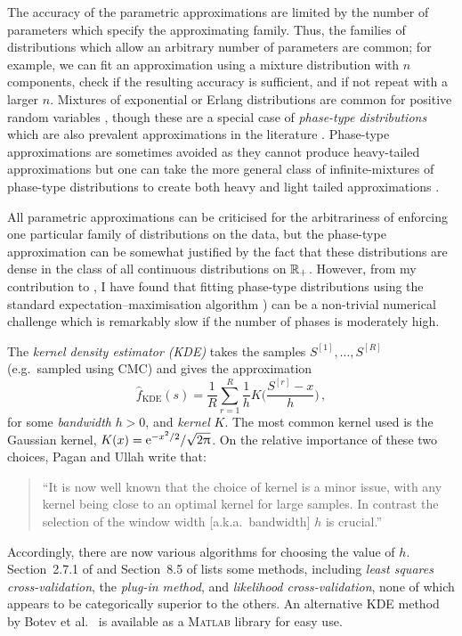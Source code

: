 The accuracy of the parametric approximations are limited by the number of parameters which specify the approximating family. Thus, the families of distributions which allow an arbitrary number of parameters are common; for example, we can fit an approximation using a mixture distribution with $n$ components, check if the resulting accuracy is sufficient, and if not repeat with a larger $n$. Mixtures of exponential or Erlang distributions are common for positive random variables \cite{WiWo07,LeLi10,WiLi11}, though these are a special case of \emph{phase-type distributions} which are also prevalent approximations in the literature \cite{bladt2005review,hassan2009actuarial,hassan2014use,APQ,asmussen2010ruin}. Phase-type approximations are sometimes avoided as they cannot produce heavy-tailed approximations \cite{embrechts2009panjer} but one can take the more general class of infinite-mixtures of phase-type distributions to create both heavy and light tailed approximations \cite{rojas2017asymptotic,yao2016estimating}.

All parametric approximations can be criticised for the arbitrariness of enforcing one particular family of distributions on the data, but the phase-type approximation can be somewhat justified by the fact that these distributions are dense in the class of all continuous distributions on $\mathbb{R}_+$. However, from my contribution to \cite{asmussen2018phase}, I have found that fitting phase-type distributions using the standard expectation--maximisation algorithm \cite{asmussen1996fitting,olsson1996estimation}) can be a non-trivial numerical challenge which is remarkably slow if the number of phases is moderately high.

The \emph{kernel density estimator (KDE)} \cite{wand1994kernel} takes the samples $S^{[1]}, \dots, S^{[R]}$ (e.g.\ sampled using CMC) and gives the approximation
\[ \hat{f}_{\mathrm{KDE}}(s) = \frac{1}{R} \sum_{r=1}^{R} \frac{1}{h} K\bigl(\frac{S^{[r]} - x}{h}\bigr) \,, \]
for some \emph{bandwidth} $h > 0$, and \emph{kernel} $K$. The most common kernel used is the Gaussian kernel, $K(x) = \mathrm{e}^{-x^2/2}/\sqrt{2\uppi}$. On the relative importance of these two choices, Pagan and Ullah \cite[p.\ 19]{pagan1999nonparametric} write that:
\begin{quote}
	``It is now well known that the choice of kernel is a minor issue, with any kernel being close to an optimal kernel for large samples. In contrast the selection of the window width [a.k.a.\ bandwidth] $h$ is crucial.''
\end{quote}
Accordingly, there are now various algorithms for choosing the value of $h$. Section~2.7.1 of \cite{pagan1999nonparametric} and Section~8.5 of \cite{kroese2013handbook} lists some methods, including \emph{least squares cross-validation}, the \emph{plug-in method}, and \emph{likelihood cross-validation}, none of which appears to be categorically superior to the others. An alternative KDE method by Botev et al.\ \cite{botev2010kernel} is available as a \textsc{Matlab} library for easy use.



